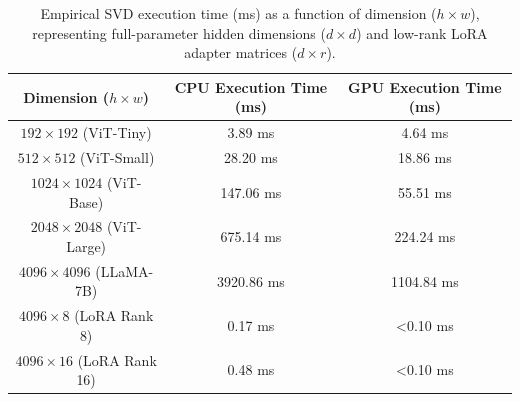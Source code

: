 \documentclass{article}
\theoremstyle{plain}
\theoremstyle{definition}
\theoremstyle{remark}
\begin{document}
\begin{table}[ht]
  \caption{Empirical SVD execution time (ms) as a function of dimension ($h \times w$), representing full-parameter hidden dimensions ($d \times d$) and low-rank LoRA adapter matrices ($d \times r$).}
  \label{tab:svd_benchmark}
  \vskip 0.1in
  \begin{center}
  \begin{small}
  \begin{sc}
  \begin{tabular}{ccc}
    \toprule
    Dimension ($h \times w$) & CPU Execution Time (ms) & GPU Execution Time (ms) \\
    \midrule
    $192 \times 192$ (ViT-Tiny) & 3.89 ms & 4.64 ms \\
    $512 \times 512$ (ViT-Small) & 28.20 ms & 18.86 ms \\
    $1024 \times 1024$ (ViT-Base) & 147.06 ms & 55.51 ms \\
    $2048 \times 2048$ (ViT-Large) & 675.14 ms & 224.24 ms \\
    $4096 \times 4096$ (LLaMA-7B) & 3920.86 ms & 1104.84 ms \\
    \midrule
    $4096 \times 8$ (LoRA Rank 8) & 0.17 ms & <0.10 ms \\
    $4096 \times 16$ (LoRA Rank 16) & 0.48 ms & <0.10 ms \\
    \bottomrule
  \end{tabular}
  \end{sc}
  \end{small}
  \end{center}
  \vskip -0.1in
\end{table}
\end{document}
